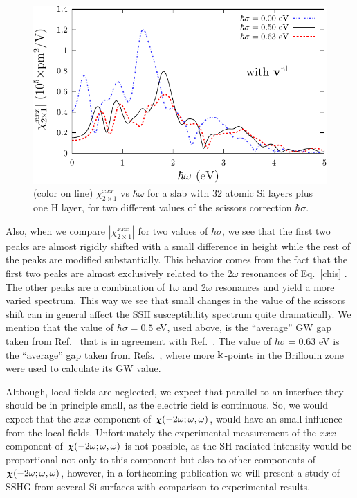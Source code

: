 \documentclass[floatfix,prb,aps,superscriptaddress,11pt,preprint,letterpaper]{revtex4}
\def\chon{black}
\begin{document}
\begin{figure}
\centering 
\includegraphics[scale=.8]{plots/fig4}
\caption{(color on line) 
$\chi^{xxx}_{2\times 1}$
vs $\hbar\omega$ for a slab {\color{\chon} with} 32 
atomic Si layers plus one {\color{\chon} H layer}, 
for two different values of 
the scissors correction $\hbar\sigma$. 
\label{fig4}} 
\end{figure}
Also, when we compare 
$|\chi^{xxx}_{2\times 1}|$ for two values of $\hbar\sigma$,
we see that the {\color{\chon} first} two peaks are almost rigidly 
shifted with a small difference in {\color{\chon} height while} 
the rest of the peaks are modified substantially. 
This {\color{\chon} behavior comes} from the fact that the first two
peaks are {\color{\chon} almost exclusively related} to the 
2$\omega$ resonances of
Eq.~\eqref{chis}{\color{\chon} . The} other peaks are a combination 
of 1$\omega$ and 2$\omega$ resonances 
{\color{\chon} and yield a more varied} spectrum. 
This way we see that small changes in the value of the 
scissors shift can in general affect the SSH susceptibility 
spectrum quite dramatically.
We mention that
{\color{\chon} the} value of $\hbar\sigma=0.5$ eV, used above, 
is the ``average'' GW gap taken from 
Ref.~ 
{\color{\chon} that} is in agreement with Ref.~. 
{\color{\chon} The} value of $\hbar\sigma=0.63$ eV is the ``average'' 
gap taken from Refs.~, 
where more {\color{\chon}$\mathbf{k}$-points} in the Brillouin zone were
used to calculate its GW value.

Although, local fields are neglected, we expect that parallel to an
interface they should be in principle 
small, as the electric field is continuous. So, we would expect that the $xxx$ component 
of 
$\boldsymbol{\chi}(-2\omega;\omega,\omega)$, would have an small influence from the local fields.
Unfortunately the experimental measurement of the $xxx$
component of $\boldsymbol{\chi}(-2\omega;\omega,\omega)$ is not possible, as the SH 
radiated intensity would be proportional not only to this component 
but also to other components of $\boldsymbol{\chi}(-2\omega;\omega,\omega)$,  
however,
in a forthcoming publication 
we will present a study of SSHG from several 
Si surfaces 
with comparison to experimental 
results. 
\end{document}
